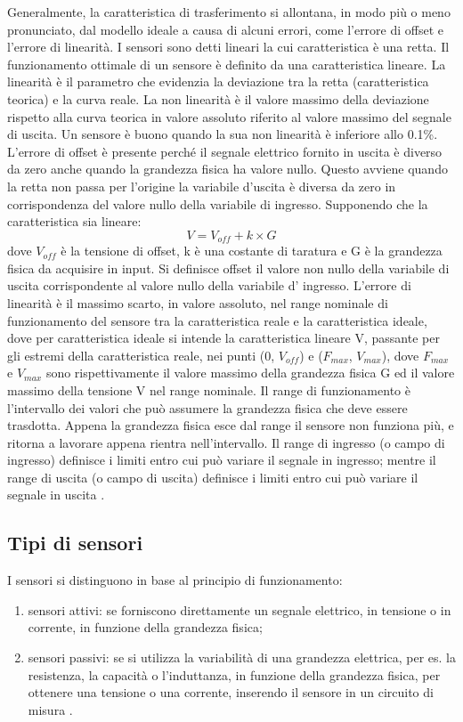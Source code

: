 \documentclass[a4paper]{report} %
\begin{document}
Generalmente, la caratteristica di trasferimento si allontana, in modo più o meno pronunciato, dal modello ideale a causa di alcuni errori, come l'errore di offset e l'errore di linearità. 
I sensori sono detti lineari la cui caratteristica è una retta. Il funzionamento ottimale di un sensore è definito da una caratteristica lineare. La linearità è il parametro che evidenzia la deviazione tra la retta (caratteristica teorica) e la curva reale. 
La non linearità è il valore massimo della deviazione rispetto alla curva teorica in valore assoluto riferito al valore massimo del segnale di uscita. Un sensore è buono quando la sua non linearità è inferiore allo 0.1\%.
L'errore di offset è presente perché il segnale elettrico fornito in uscita è diverso da zero anche quando la grandezza fisica ha valore nullo. Questo avviene quando la retta non passa per l'origine la variabile d'uscita è diversa da zero in corrispondenza del valore nullo della variabile di ingresso. Supponendo che la caratteristica sia lineare:
\begin{equation}
V = V_{off} + k \times G
\end{equation}
dove $V_{off}$ è la tensione di offset, k è una costante di taratura e G è la grandezza fisica da acquisire in input. Si definisce offset il valore non nullo della variabile di uscita corrispondente al valore nullo della variabile d' ingresso.
L'errore di linearità è il massimo scarto, in valore assoluto, nel range nominale di funzionamento del sensore tra la caratteristica reale e la caratteristica ideale, dove per caratteristica ideale si intende la caratteristica lineare V, passante per gli estremi della caratteristica reale, nei punti (0, $V_{off}$) e ($F_{max}$, $V_{max}$), dove $F_{max}$ e $V_{max}$ sono rispettivamente il valore massimo della grandezza fisica G ed il valore massimo della tensione V nel range nominale. 
Il range di funzionamento è l'intervallo dei valori che può assumere la grandezza fisica che deve essere trasdotta. Appena la grandezza fisica esce dal range il sensore non funziona più, e ritorna a lavorare appena rientra nell'intervallo. Il range di ingresso (o campo di ingresso) definisce i limiti entro cui può variare il segnale in ingresso; mentre il range di uscita (o campo di uscita) definisce i limiti entro cui può variare il segnale in uscita \cite{art:rif.1, art:rif.12}.   

\subsection{Tipi di sensori}
I sensori si distinguono in base al principio di funzionamento:
\begin{enumerate}
\item sensori attivi: se forniscono direttamente un segnale elettrico, in tensione o in corrente, in funzione della grandezza fisica;
\item sensori passivi: se si utilizza la variabilità di una grandezza elettrica, per es. la resistenza, la capacità o l'induttanza, in funzione della grandezza fisica, per ottenere una tensione o una corrente, inserendo il sensore in un circuito di misura \cite{art:rif.1}.   
\end{enumerate}
\end{document}

